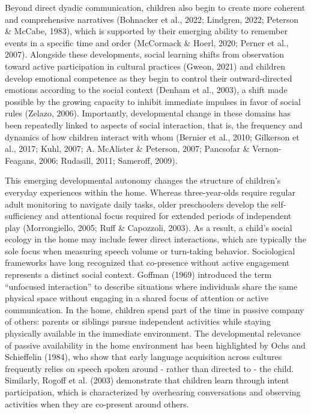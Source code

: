 \documentclass[
  english,
  12pt,
  man,floatsintext]{apa6}
\begin{document}
Beyond direct dyadic communication, children also begin to create more coherent and comprehensive narratives (Bohnacker et al., 2022; Lindgren, 2022; Peterson \& McCabe, 1983), which is supported by their emerging ability to remember events in a specific time and order (McCormack \& Hoerl, 2020; Perner et al., 2007). Alongside these developments, social learning shifts from observation toward active participation in cultural practices (Gweon, 2021) and children develop emotional competence as they begin to control their outward-directed emotions according to the social context (Denham et al., 2003), a shift made possible by the growing capacity to inhibit immediate impulses in favor of social rules (Zelazo, 2006). Importantly, developmental change in these domains has been repeatedly linked to aspects of social interaction, that is, the frequency and dynamics of how children interact with whom (Bernier et al., 2010; Gilkerson et al., 2017; Kuhl, 2007; A. McAlister \& Peterson, 2007; Pancsofar \& Vernon-Feagans, 2006; Rudasill, 2011; Sameroff, 2009).

This emerging developmental autonomy changes the structure of children's everyday experiences within the home. Whereas three-year-olds require regular adult monitoring to navigate daily tasks, older preschoolers develop the self-sufficiency and attentional focus required for extended periods of independent play (Morrongiello, 2005; Ruff \& Capozzoli, 2003). As a result, a child's social ecology in the home may include fewer direct interactions, which are typically the sole focus when measuring speech volume or turn-taking behavior. Sociological frameworks have long recognized that co-presence without active engagement represents a distinct social context. Goffman (1969) introduced the term ``unfocused interaction'' to describe situations where individuals share the same physical space without engaging in a shared focus of attention or active communication. In the home, children spend part of the time in passive company of others: parents or siblings pursue independent activities while staying physically available in the immediate environment. The developmental relevance of passive availability in the home environment has been highlighted by Ochs and Schieffelin (1984), who show that early language acquisition across cultures frequently relies on speech spoken around - rather than directed to - the child. Similarly, Rogoff et al. (2003) demonstrate that children learn through intent participation, which is characterized by overhearing conversations and observing activities when they are co-present around others.
\end{document}
